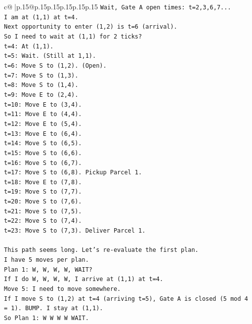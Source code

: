 \documentclass{article}
\begin{document}
{\begin{supertabular}{c@{$\;$}|p{.15\linewidth}@{}p{.15\linewidth}p{.15\linewidth}p{.15\linewidth}p{.15\linewidth}p{.15\linewidth}}
{{{\texttt{Wait, Gate A open times: t=2,3,6,7...} \\
\texttt{I am at (1,1) at t=4.} \\
\texttt{Next opportunity to enter (1,2) is t=6 (arrival).} \\
\texttt{So I need to wait at (1,1) for 2 ticks?} \\
\texttt{t=4: At (1,1).} \\
\texttt{t=5: Wait. (Still at 1,1).} \\
\texttt{t=6: Move S to (1,2). (Open).} \\
\texttt{t=7: Move S to (1,3).} \\
\texttt{t=8: Move S to (1,4).} \\
\texttt{t=9: Move E to (2,4).} \\
\texttt{t=10: Move E to (3,4).} \\
\texttt{t=11: Move E to (4,4).} \\
\texttt{t=12: Move E to (5,4).} \\
\texttt{t=13: Move E to (6,4).} \\
\texttt{t=14: Move S to (6,5).} \\
\texttt{t=15: Move S to (6,6).} \\
\texttt{t=16: Move S to (6,7).} \\
\texttt{t=17: Move S to (6,8). Pickup Parcel 1.} \\
\texttt{t=18: Move E to (7,8).} \\
\texttt{t=19: Move S to (7,7).} \\
\texttt{t=20: Move S to (7,6).} \\
\texttt{t=21: Move S to (7,5).} \\
\texttt{t=22: Move S to (7,4).} \\
\texttt{t=23: Move S to (7,3). Deliver Parcel 1.} \\
\\ 
\texttt{This path seems long. Let's re{-}evaluate the first plan.} \\
\texttt{I have 5 moves per plan.} \\
\texttt{Plan 1: W, W, W, W, WAIT?} \\
\texttt{If I do W, W, W, W, I arrive at (1,1) at t=4.} \\
\texttt{Move 5: I need to move somewhere.} \\
\texttt{If I move S to (1,2) at t=4 (arriving t=5), Gate A is closed (5 mod 4 = 1). BUMP. I stay at (1,1).} \\
\texttt{So Plan 1: W W W W WAIT.} \\
}}}
\end{supertabular}}
\end{document}
